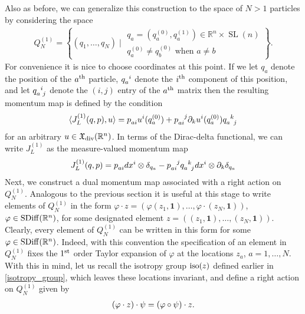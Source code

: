 \documentclass[12pt]{amsart}
\newcommand{\R}{\ensuremath{\mathbb{R}}}
\DeclareMathOperator{\SL}{SL}
\begin{document}
  Also as before, we can generalize this construction to the space of
  $N > 1$ particles by considering the space
  \begin{align*}
    Q^{(1)}_N = \left\{  ( q_1 , \dots, q_N ) \mid
      \begin{array}{c}
        q_a = (q^{(0)}_a,q^{(1)}_a) \in \R^n \times \SL(n) \\
        q^{(0)}_a \neq q^{(0)}_b \text{ when } a \neq b
      \end{array} \right\}.
  \end{align*}
  For convenience it is nice to choose coordinates at this point.
  If we let $q_a$ denote the position of the $a^{\rm th}$ particle,
  $q\indices{_a^i}$ denote the $i^{\rm th}$ component of this position,
  and let $q\indices{_a^i_j}$ denote the $(i,j)$ entry of the $a^{\rm th}$
  matrix then the resulting momentum map is defined by the condition
  \begin{align*}
    \langle J_L^{(1)}(q,p) , u \rangle
    = p\indices{_a_i} u^i(q^{(0)}_a) + p\indices{_a_i^j} \partial_k u^i(q^{(0)}_a) q\indices{_a^k_j}
  \end{align*}
  for an arbitrary $u \in \mathfrak{X}_{\rm div}(\R^n)$.
  In terms of the Dirac-delta functional, we can write $J_L^{(1)}$ as the measure-valued momentum map
  \begin{align*}
    J_L^{(1)}(q, p)
    = p\indices{_a_i} dx^i \otimes \delta_{q_a}
     -p\indices{_a_i^j} q\indices{_a^k_j} dx^i \otimes \partial_k \delta_{q_a}
  \end{align*}
  Next, we construct a dual momentum map associated with a right action on $Q_N^{(1)}$. Analogous to the previous section  it is useful at this stage to write elements of $Q_N^{(1)}$ in the form $ \varphi \cdot z = (\varphi (z_1, {\mathbf{1}}), \ldots, \varphi \cdot (z_N , \mathbf{1}))$, $\varphi \in {\rm SDiff}(\mathbb{R}^n)$, for some designated element $ z=( (z_1, \mathbf{1}), \ldots, (z_N, \mathbf{1}))$. Clearly, every element of $Q_N^{(1)}$ can be written in this form for some  $\varphi \in {\rm SDiff}(\mathbb{R}^n)$. Indeed, with this convention the specification of an element in $Q_N^{(1)}$ fixes the $1^{\rm st}$ order Taylor expansion of $\varphi$ at the locations $z_a$, $a = 1, \ldots, N$. With this in mind, let us recall the isotropy group ${\rm iso}(z)$ defined earlier in \eqref{isotropy_group}, which leaves these locations invariant, and define a right action on  $Q_N^{(1)}$ given by 
\begin{align}
	 (\varphi \cdot z) \cdot \psi  = (\varphi \circ \psi) \cdot z. \notag
	 \end{align}
\end{document}
